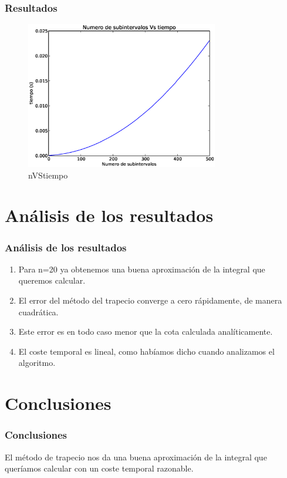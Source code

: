 \documentclass{beamer}
\begin{document}
\begin{frame}
  \frametitle{Resultados}
  \begin{figure}[!th]
    \begin{center}
      \includegraphics[width=0.75\textwidth]{img/Plot_nVStime.eps}
      \caption{nVStiempo}
      \label{fig:2}
    \end{center}
  \end{figure}
\end{frame}

\section{Análisis de los resultados}
  \begin{frame}
  \frametitle{Análisis de los resultados}
  \begin{enumerate}
    \item Para n=20 ya obtenemos una buena aproximación de la integral que queremos calcular.
    \pause
    \item El error del método del trapecio converge a cero rápidamente, de manera cuadrática.
    \pause
    \item Este error es en todo caso menor que la cota calculada analíticamente.
    \pause
    \item El coste temporal es lineal, como habíamos dicho cuando analizamos el algoritmo.
  \end{enumerate}
\end{frame}


\section{Conclusiones}
\begin{frame}
 \frametitle{Conclusiones}
  El método de trapecio nos da una buena aproximación de la integral que queríamos calcular con un coste temporal razonable.
\end{frame}
\end{document}
